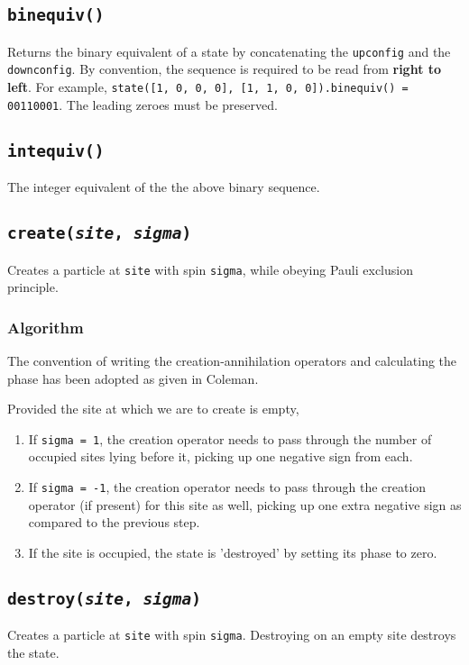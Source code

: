 \documentclass[]{book}
\begin{document}
\subsection{\texttt{binequiv()}}
Returns the binary equivalent of a state by concatenating the \texttt{upconfig} and the \texttt{downconfig}. By convention, the sequence is required to be read from \textbf{right to left}. For example,  \texttt{state([1, 0, 0, 0], [1, 1, 0, 0]).binequiv() = 00110001}. The leading zeroes must be preserved.

\subsection{\texttt{intequiv()}}
The integer equivalent of the the above binary sequence.

\subsection{\texttt{create(\textit{site}, \textit{sigma})}}
Creates a particle at \texttt{site} with spin \texttt{sigma}, while obeying Pauli exclusion principle.

\subsubsection*{Algorithm}
The convention of writing the creation-annihilation operators and calculating the phase has been adopted as given in Coleman.

Provided the site at which we are to create is empty,
\begin{enumerate}
\item If \texttt{sigma = 1}, the creation operator needs to pass through the number of occupied sites lying before it, picking up one negative sign from each.

\item If \texttt{sigma = -1}, the creation operator needs to pass through the creation operator (if present) for this site as well, picking up one extra negative sign as compared to the previous step.

\item If the site is occupied, the state is 'destroyed' by setting its phase to zero.

\end{enumerate}

\subsection{\texttt{destroy(\textit{site}, \textit{sigma})}}
Creates a particle at \texttt{site} with spin \texttt{sigma}. Destroying on an empty site destroys the state.
\end{document}

